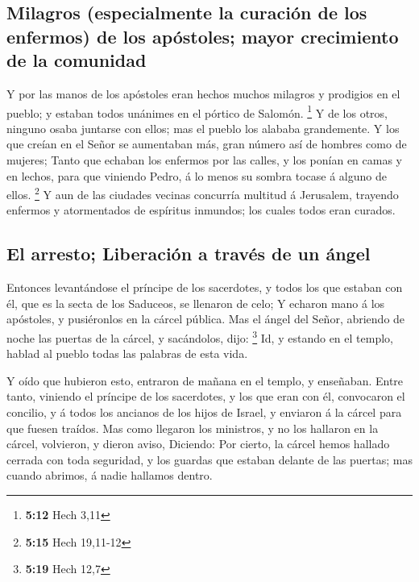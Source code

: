 \hypertarget{milagros-especialmente-la-curaciuxf3n-de-los-enfermos-de-los-apuxf3stoles-mayor-crecimiento-de-la-comunidad}{%
\subsection{Milagros (especialmente la curación de los enfermos) de los
apóstoles; mayor crecimiento de la
comunidad}\label{milagros-especialmente-la-curaciuxf3n-de-los-enfermos-de-los-apuxf3stoles-mayor-crecimiento-de-la-comunidad}}

 Y por las manos de los apóstoles eran hechos muchos
milagros y prodigios en el pueblo; y estaban todos unánimes en el
pórtico de Salomón. \footnote{\textbf{5:12} Hech 3,11}  Y
de los otros, ninguno osaba juntarse con ellos; mas el pueblo los
alababa grandemente.  Y los que creían en el Señor se
aumentaban más, gran número así de hombres como de mujeres;
 Tanto que echaban los enfermos por las calles, y los
ponían en camas y en lechos, para que viniendo Pedro, á lo menos su
sombra tocase á alguno de ellos. \footnote{\textbf{5:15} Hech 19,11-12}
 Y aun de las ciudades vecinas concurría multitud á
Jerusalem, trayendo enfermos y atormentados de espíritus inmundos; los
cuales todos eran curados.

\hypertarget{el-arresto-liberaciuxf3n-a-travuxe9s-de-un-uxe1ngel}{%
\subsection{El arresto; Liberación a través de un
ángel}\label{el-arresto-liberaciuxf3n-a-travuxe9s-de-un-uxe1ngel}}

 Entonces levantándose el príncipe de los sacerdotes, y
todos los que estaban con él, que es la secta de los Saduceos, se
llenaron de celo;  Y echaron mano á los apóstoles, y
pusiéronlos en la cárcel pública.  Mas el ángel del
Señor, abriendo de noche las puertas de la cárcel, y sacándolos, dijo:
\footnote{\textbf{5:19} Hech 12,7}  Id, y estando en el
templo, hablad al pueblo todas las palabras de esta vida.

 Y oído que hubieron esto, entraron de mañana en el
templo, y enseñaban. Entre tanto, viniendo el príncipe de los
sacerdotes, y los que eran con él, convocaron el concilio, y á todos los
ancianos de los hijos de Israel, y enviaron á la cárcel para que fuesen
traídos.  Mas como llegaron los ministros, y no los
hallaron en la cárcel, volvieron, y dieron aviso, 
Diciendo: Por cierto, la cárcel hemos hallado cerrada con toda
seguridad, y los guardas que estaban delante de las puertas; mas cuando
abrimos, á nadie hallamos dentro.

